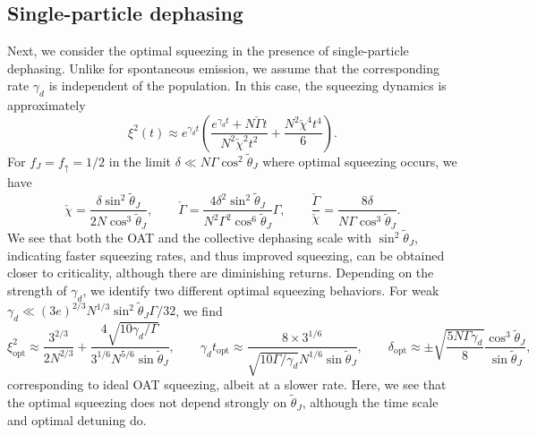 \subsection{Single-particle dephasing}

Next, we consider the optimal squeezing in the presence of single-particle dephasing. Unlike for spontaneous emission, we assume that the corresponding rate $\gamma_d$ is independent of the population. In this case, the squeezing dynamics is approximately
\begin{equation}
    \xi^2(t) \approx e^{\gamma_d t}\left(\frac{e^{\gamma_d t} + N \check{\Gamma} t}{N^2 \check{\chi}^2 t^2} + \frac{N^2 \check{\chi}^4 t^4}{6} \right).
\end{equation}
For $f_J = f_{\uparrow} = 1/2$ in the limit $\delta \ll N \Gamma \cos^2 \tilde{\theta}_J$ where optimal squeezing occurs, we have
\begin{equation}
    \check{\chi} = \frac{ \delta \sin^2 \tilde{\theta}_J}{2 N \cos^3 \tilde{\theta}_J}, \qquad \check{\Gamma} = \frac{4 \delta^2 \sin^2 \tilde{\theta}_J}{N^2 \Gamma^2 \cos^6 \tilde{\theta}_J} \Gamma, \qquad \frac{\check{\Gamma}}{\check{\chi}} = \frac{8 \delta}{N \Gamma \cos^3 \tilde{\theta}_J}.
\end{equation}
We see that both the OAT and the collective dephasing scale with $\sin^2 \tilde{\theta}_J$, indicating faster squeezing rates, and thus improved squeezing, can be obtained closer to criticality, although there are diminishing returns. Depending on the strength of $\gamma_d$, we identify two different optimal squeezing behaviors. For weak $\gamma_d \ll (3 e)^{2/3} N^{1/3} \sin^2 \tilde{\theta}_J \Gamma/32$, we find
\begin{equation}
    \xi^2_{\text{opt}} \approx \frac{3^{2/3}}{2 N^{2/3}} + \frac{4 \sqrt{10 \gamma_d/\Gamma}}{3^{1/6} N^{5/6} \sin \tilde{\theta}_J}, \qquad \gamma_d t_{\text{opt}} \approx \frac{ 8 \times 3^{1/6}}{\sqrt{10 \Gamma /\gamma_d} N^{1/6} \sin \tilde{\theta}_J }, \qquad \delta_{\text{opt}} \approx \pm \sqrt{\frac{5 N \Gamma \gamma_d}{8}} \frac{\cos^3 \tilde{\theta}_J}{\sin \tilde{\theta}_J} ,
\end{equation}
corresponding to ideal OAT squeezing, albeit at a slower rate. Here, we see that the optimal squeezing does not depend strongly on $\tilde{\theta}_J$, although the time scale and optimal detuning do.

